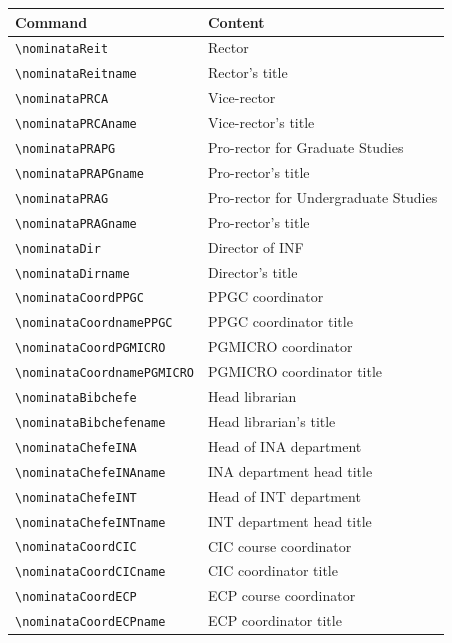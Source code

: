 \documentclass[11pt,a4paper]{article}
\newcommand{\cmd}[1]{\texttt{\textbackslash #1}}
\begin{document}
\begin{center}
\footnotesize
\begin{tabular}{@{}ll@{}}
  \toprule
  Command & Content \\
  \midrule
  \cmd{nominataReit}          & Rector \\
  \cmd{nominataReitname}      & Rector's title \\
  \cmd{nominataPRCA}          & Vice-rector \\
  \cmd{nominataPRCAname}      & Vice-rector's title \\
  \cmd{nominataPRAPG}         & Pro-rector for Graduate Studies \\
  \cmd{nominataPRAPGname}     & Pro-rector's title \\
  \cmd{nominataPRAG}          & Pro-rector for Undergraduate Studies \\
  \cmd{nominataPRAGname}      & Pro-rector's title \\
  \cmd{nominataDir}           & Director of INF \\
  \cmd{nominataDirname}       & Director's title \\
  \cmd{nominataCoordPPGC}     & PPGC coordinator \\
  \cmd{nominataCoordnamePPGC} & PPGC coordinator title \\
  \cmd{nominataCoordPGMICRO}  & PGMICRO coordinator \\
  \cmd{nominataCoordnamePGMICRO} & PGMICRO coordinator title \\
  \cmd{nominataBibchefe}      & Head librarian \\
  \cmd{nominataBibchefename}  & Head librarian's title \\
  \cmd{nominataChefeINA}      & Head of INA department \\
  \cmd{nominataChefeINAname}  & INA department head title \\
  \cmd{nominataChefeINT}      & Head of INT department \\
  \cmd{nominataChefeINTname}  & INT department head title \\
  \cmd{nominataCoordCIC}      & CIC course coordinator \\
  \cmd{nominataCoordCICname}  & CIC coordinator title \\
  \cmd{nominataCoordECP}      & ECP course coordinator \\
  \cmd{nominataCoordECPname}  & ECP coordinator title \\
  \bottomrule
\end{tabular}
\end{center}
\end{document}
